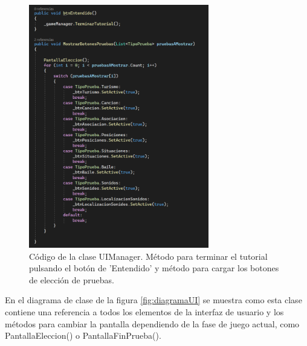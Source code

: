 \begin{figure}
	\centering
	\includegraphics[width=0.7\textwidth]{04.Desarrollo/05.Entrega5/01.Iteracion5_1/00.Figuras/12.ui_manager_mostrar_botones.png}
	\caption{Código de la clase UIManager. Método para terminar el tutorial pulsando el botón de 'Entendido' y método para cargar los botones de elección de pruebas.}
	\label{fig:uiManagerCodigo}
\end{figure}


En el diagrama de clase de la figura \ref{fig:diagramaUI} se muestra como esta clase contiene una referencia a todos los elementos de la interfaz de usuario y los métodos para cambiar la pantalla dependiendo de la fase de juego actual, como PantallaEleccion() o PantallaFinPrueba().

